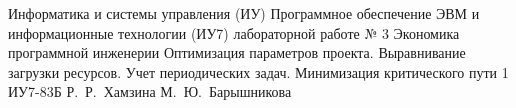 \documentclass{bmstu}
\begin{document}
\makereporttitle
	{Информатика и системы управления (ИУ)}
	{Программное обеспечение ЭВМ и информационные технологии (ИУ7)}
	{лабораторной работе № 3}
	{Экономика программной инженерии}
	{Оптимизация параметров проекта. Выравнивание загрузки ресурсов. Учет периодических задач. Минимизация критического пути}
	{1}
	{ИУ7-83Б}
	{Р.~Р.~Хамзина}
	{М.~Ю.~Барышникова}


\end{document}
